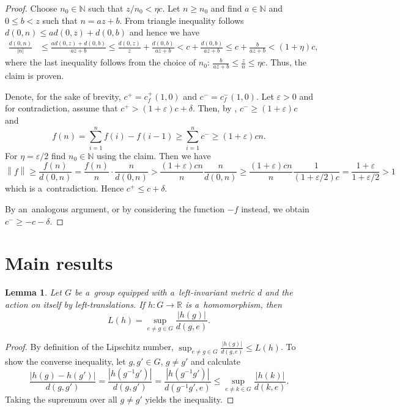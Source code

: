 \documentclass[11pt,a4paper]{amsart}
\newtheorem{lemma}[theorem]{Lemma}
\theoremstyle{definition}
\newcommand{\R}{\mathbb{R}}
\newcommand{\N}{\mathbb{N}}
\newcommand{\eps}{\varepsilon}
\newcommand{\abs}[1]{\left| #1 \right|}
\newcommand{\norm}[1]{\left\| #1 \right\|}
\begin{document}
{\begin{proof}
			Choose $n_0 \in \N$ such that $z/n_0 < \eta c$. Let $n \geq n_0$ and find $a \in \N$ and $0 \leq b < z$ such that $n = az + b$. From triangle inequality follows $d(0, n) \leq a d(0, z) + d(0, b)$ and hence we have
			\begin{align*}
				\frac{d(0, n)}{\abs{n}}
				&\leq \frac{a d(0, z) + d(0, b)}{a z + b}
				\leq \frac{d(0, z)}{z} + \frac{d(0, b)}{az+b}
				< c + \frac{d(0, b)}{az+b}
				\leq c + \frac{b}{az+b}
				< (1+\eta)c,
			\end{align*}
			where the last inequality follows from the choice of $n_0$: $\frac{b}{az+b} \leq \frac{z}{n} \leq \eta c$. Thus, the claim is proven.
			
			Denote, for the sake of brevity, $c^+ = c^+_f(1,0)$ and $c^- = c^-_f(1,0)$.
			Let $\eps > 0$ and for contradiction, assume that $c^+ > (1+\eps)c + \delta$. Then, by , $c^- \geq (1 + \eps)c$ and
			\begin{equation*}
				f(n) = \sum_{i=1}^n f(i) - f(i-1) \geq \sum_{i=1}^n c^- \geq (1+\eps)cn.
			\end{equation*}
			For $\eta = \eps/2$ find $n_0 \in \N$ using the claim. Then we have
			\begin{equation*}
				\norm{f}
				\geq \frac{f(n)}{d(0, n)}
				= \frac{f(n)}{n} \cdot \frac{n}{d(0, n)}
				> \frac{(1+\eps)cn}{n} \frac{n}{d(0, n)}
				\geq \frac{(1+\eps)cn}{n} \frac{1}{(1+\eps/2)c}
				= \frac{1+\eps}{1+\eps/2}
				> 1
			\end{equation*}
			which is a~contradiction. Hence $c^+ \leq c + \delta$.
			
			By an~analogous argument, or by considering the function $-f$ instead, we obtain $c^- \geq -c -\delta$.
		\end{proof}
		
	}
	
	\section{Main results} \label{sect:main}
	
	\begin{lemma} \label{lma:LNforHomo}
		Let $G$ be a~group equipped with a~left-invariant metric $d$ and the action on itself by left-translations. If $h: G \to \R$ is a~homomorphism, then
		\begin{equation*}
			L(h) = \sup_{e \neq g \in G} \frac{\abs{h(g)}}{d(g, e)}.
		\end{equation*}
	\end{lemma}
	\begin{proof}
		By definition of the Lipschitz number, $\sup_{e \neq g \in G} \frac{\abs{h(g)}}{d(g, e)} \leq L(h)$. To show the converse inequality, let $g, g' \in G$, $g \neq g'$ and calculate
		\begin{equation*}
			\frac{\abs{h(g) - h(g')}}{d(g, g')}
			= \frac{\abs{h(g^{-1}g')}}{d(g, g')}
			= \frac{\abs{h(g^{-1}g')}}{d(g^{-1}g', e)}
			\leq \sup_{e \neq k \in G} \frac{\abs{h(k)}}{d(k, e)}.
		\end{equation*}
		Taking the supremum over all $g \neq g'$ yields the inequality.
	\end{proof}
	
\end{document}
